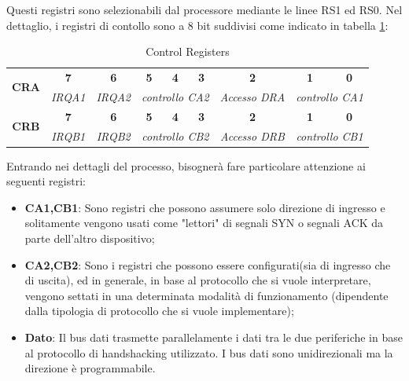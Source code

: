 Questi registri sono selezionabili dal processore mediante le linee RS1 ed RS0.
Nel dettaglio, i registri di contollo sono a 8 bit suddivisi come indicato in tabella \ref{Tab:control_registers}:

\begin{table}[!ht]
    \centering
    \renewcommand{\arraystretch}{1.5} %
    \setlength{\tabcolsep}{8pt} %
    \begin{tabular}{|c|c|c|c|c|c|c|c|c|}
        \hline
        \multirow{2}{*}{\textbf{CRA}} 
        & \textbf{7}  & \textbf{6}  & \textbf{5}  & \textbf{4}  & \textbf{3}  & \textbf{2}  & \textbf{1}  & \textbf{0}  \\ 
        \cline{2-9} 
        & \textit{IRQA1}  & \textit{IRQA2}  
        & \multicolumn{3}{c|}{\textit{controllo CA2}}  
        & \textit{Accesso DRA}  
        & \multicolumn{2}{c|}{\textit{controllo CA1}}  \\ 
        \hline
        \multirow{2}{*}{\textbf{CRB}}  
        & \textbf{7}  & \textbf{6}  & \textbf{5}  & \textbf{4}  & \textbf{3}  & \textbf{2}  & \textbf{1}  & \textbf{0}  \\ 
        \cline{2-9} 
        & \textit{IRQB1}  & \textit{IRQB2}  
        & \multicolumn{3}{c|}{\textit{controllo CB2}}  
        & \textit{Accesso DRB}  
        & \multicolumn{2}{c|}{\textit{controllo CB1}}  \\ 
        \hline
    \end{tabular}
    \caption{Control Registers}
    \label{Tab:control_registers}
\end{table}



Entrando nei dettagli del processo, bisognerà fare particolare attenzione ai seguenti registri:
\begin{itemize}
    \item \textbf{CA1,CB1}: Sono registri che possono assumere solo direzione di ingresso e solitamente vengono usati come "lettori" di segnali SYN o segnali ACK da parte dell'altro dispositivo;
    \item \textbf{CA2,CB2}: Sono i registri che possono essere configurati(sia di ingresso che di uscita), ed in generale, in base al protocollo che si vuole interpretare, vengono settati in una determinata modalità di funzionamento (dipendente dalla tipologia di protocollo che si vuole implementare);
    \item \textbf{Dato}: Il bus dati trasmette parallelamente i dati tra le due periferiche in base al protocollo di handshacking utilizzato. I bus dati sono unidirezionali ma la direzione è programmabile. 
\end{itemize}

